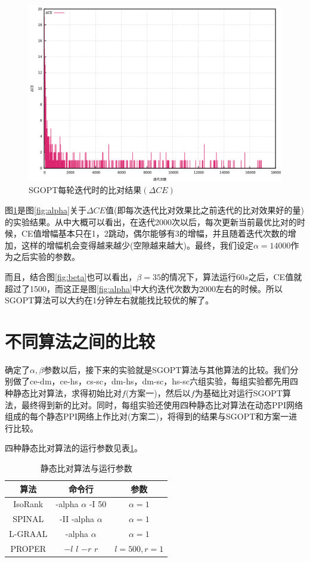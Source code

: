 \begin{figure}[htbp]
\centering
\includegraphics[height=0.4\textheight]{pic/alpha_d.png}
\caption{SGOPT每轮迭代时的比对结果$(\Delta CE)$} 
\label{fig:alpha_d}
\end{figure}

图\ref{fig:alpha_d}是图\ref{fig:alpha}关于$\Delta CE$值(即每次迭代比对效果比之前迭代的比对效果好的量)的实验结果。从中大概可以看出，在迭代2000次以后，每次更新当前最优比对的时候，CE值增幅基本只在1，2跳动，偶尔能够有3的增幅，并且随着迭代次数的增加，这样的增幅机会变得越来越少(空隙越来越大)。最终，我们设定$\alpha=14000$作为之后实验的参数。

而且，结合图\ref{fig:beta}也可以看出，$\beta=35$的情况下，算法运行$60s$之后，CE值就超过了1500，而这正是图\ref{fig:alpha}中大约迭代次数为2000左右的时候。所以SGOPT算法可以大约在1分钟左右就能找比较优的解了。

\section{不同算法之间的比较}

确定了$\alpha,\beta$参数以后，接下来的实验就是SGOPT算法与其他算法的比较。我们分别做了ce-dm，ce-hs，cs-sc，dm-hs，dm-sc，hs-sc六组实验，每组实验都先用四种静态比对算法，求得初始比对$f$(方案一)，然后以$f$为基础比对运行SGOPT算法，最终得到新的比对。同时，每组实验还使用四种静态比对算法在动态PPI网络组成的每个静态PPI网络上作比对(方案二)，将得到的结果与SGOPT和方案一进行比较。

四种静态比对算法的运行参数见表\ref{table:3}。

\begin{table}[htbp]
    \centering
    \caption{静态比对算法与运行参数}
    \label{table:3}
    \begin{tabular}{ccc}
         \hline 算法&命令行&参数\\
         \hline IsoRank&-alpha $\alpha$ -I 50&$\alpha=1$\\
         SPINAL&-II -alpha $\alpha$&$\alpha=1$\\
         L-GRAAL&-alpha $\alpha$&$\alpha=1$\\
         PROPER&$-l$ $l$ $-r$ $r$&$l=500,r=1$\\
         \hline
    \end{tabular}
\end{table}

